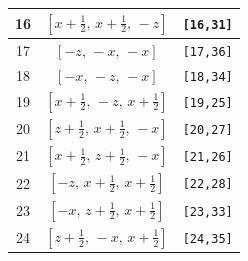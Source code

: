 \documentclass[fleqn,8pt]{jsarticle}
\begin{document}
\begin{longtable}{ccc}
16 & $\left[ x + \frac{1}{2},\, x + \frac{1}{2},\, - z \right]$ & {\tt [16,31]} \\ \hline
17 & $\left[ - z,\, - x,\, - x \right]$ & {\tt [17,36]} \\ \hline
18 & $\left[ - x,\, - z,\, - x \right]$ & {\tt [18,34]} \\ \hline
19 & $\left[ x + \frac{1}{2},\, - z,\, x + \frac{1}{2} \right]$ & {\tt [19,25]} \\ \hline
20 & $\left[ z + \frac{1}{2},\, x + \frac{1}{2},\, - x \right]$ & {\tt [20,27]} \\ \hline
21 & $\left[ x + \frac{1}{2},\, z + \frac{1}{2},\, - x \right]$ & {\tt [21,26]} \\ \hline
22 & $\left[ - z,\, x + \frac{1}{2},\, x + \frac{1}{2} \right]$ & {\tt [22,28]} \\ \hline
23 & $\left[ - x,\, z + \frac{1}{2},\, x + \frac{1}{2} \right]$ & {\tt [23,33]} \\ \hline
24 & $\left[ z + \frac{1}{2},\, - x,\, x + \frac{1}{2} \right]$ & {\tt [24,35]} \\
\end{longtable}
\renewcommand{\arraystretch}{1.2}
\end{document}
